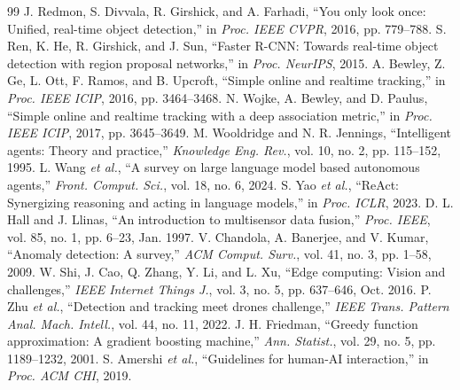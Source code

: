 \documentclass[conference]{IEEEtran}
\begin{document}
\begin{thebibliography}{99}\small
{} J. Redmon, S. Divvala, R. Girshick, and A. Farhadi, ``You only look once: Unified, real-time object detection,'' in \emph{Proc. IEEE CVPR}, 2016, pp. 779--788.
 S. Ren, K. He, R. Girshick, and J. Sun, ``Faster R-CNN: Towards real-time object detection with region proposal networks,'' in \emph{Proc. NeurIPS}, 2015.
 A. Bewley, Z. Ge, L. Ott, F. Ramos, and B. Upcroft, ``Simple online and realtime tracking,'' in \emph{Proc. IEEE ICIP}, 2016, pp. 3464--3468.
 N. Wojke, A. Bewley, and D. Paulus, ``Simple online and realtime tracking with a deep association metric,'' in \emph{Proc. IEEE ICIP}, 2017, pp. 3645--3649.
 M. Wooldridge and N. R. Jennings, ``Intelligent agents: Theory and practice,'' \emph{Knowledge Eng. Rev.}, vol. 10, no. 2, pp. 115--152, 1995.
 L. Wang \emph{et al.}, ``A survey on large language model based autonomous agents,'' \emph{Front. Comput. Sci.}, vol. 18, no. 6, 2024.
 S. Yao \emph{et al.}, ``ReAct: Synergizing reasoning and acting in language models,'' in \emph{Proc. ICLR}, 2023.
 D. L. Hall and J. Llinas, ``An introduction to multisensor data fusion,'' \emph{Proc. IEEE}, vol. 85, no. 1, pp. 6--23, Jan. 1997.
 V. Chandola, A. Banerjee, and V. Kumar, ``Anomaly detection: A survey,'' \emph{ACM Comput. Surv.}, vol. 41, no. 3, pp. 1--58, 2009.
 W. Shi, J. Cao, Q. Zhang, Y. Li, and L. Xu, ``Edge computing: Vision and challenges,'' \emph{IEEE Internet Things J.}, vol. 3, no. 5, pp. 637--646, Oct. 2016.
 P. Zhu \emph{et al.}, ``Detection and tracking meet drones challenge,'' \emph{IEEE Trans. Pattern Anal. Mach. Intell.}, vol. 44, no. 11, 2022.
 J. H. Friedman, ``Greedy function approximation: A gradient boosting machine,'' \emph{Ann. Statist.}, vol. 29, no. 5, pp. 1189--1232, 2001.
 S. Amershi \emph{et al.}, ``Guidelines for human-AI interaction,'' in \emph{Proc. ACM CHI}, 2019.
\end{thebibliography}
\end{document}
